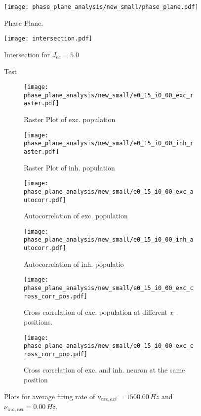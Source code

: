 \documentclass[a4paper,12pt]{article}
\begin{document}
    \begin{figure}
    \centering
        \texttt{[image: phase\_plane\_analysis/new\_small/phase\_plane.pdf]}
        \caption{Phase Plane.}
    \end{figure}
    
    \begin{figure}
    \centering
        \texttt{[image: intersection.pdf]}
        \caption{Intersection for $J_{ee} = 5.0$}
    \end{figure}
    \clearpage
    \begin{landscape}
    \begin{figure}
        \caption{Test}
    \end{figure}
    \end{landscape}
    \clearpage
\begin{figure}
    \begin{subfigure}[b]{0.49\textwidth}
        \texttt{[image: phase\_plane\_analysis/new\_small/e0\_15\_i0\_00\_exc\_raster.pdf]}
        \caption{Raster Plot of exc. population}
    \end{subfigure}
    \begin{subfigure}[b]{0.49\textwidth}
        \texttt{[image: phase\_plane\_analysis/new\_small/e0\_15\_i0\_00\_inh\_raster.pdf]}
        \caption{Raster Plot of inh. population}
    \end{subfigure}
    \begin{subfigure}[b]{0.49\textwidth}
        \texttt{[image: phase\_plane\_analysis/new\_small/e0\_15\_i0\_00\_exc\_autocorr.pdf]}
        \caption{Autocorrelation of exc. population}
    \end{subfigure}
    \begin{subfigure}[b]{0.49\textwidth}
        \texttt{[image: phase\_plane\_analysis/new\_small/e0\_15\_i0\_00\_inh\_autocorr.pdf]}
        \caption{Autocorrelation of inh. populatio}
    \end{subfigure}
    \begin{subfigure}[b]{0.49\textwidth}
        \texttt{[image: phase\_plane\_analysis/new\_small/e0\_15\_i0\_00\_exc\_cross\_corr\_pos.pdf]}
        \caption{Cross correlation of exc. population at different $x$-positions.}
    \end{subfigure}
    \begin{subfigure}[b]{0.49\textwidth}
        \texttt{[image: phase\_plane\_analysis/new\_small/e0\_15\_i0\_00\_exc\_cross\_corr\_pop.pdf]}
        \caption{Cross correlation of exc. and inh. neuron at the same position}
    \end{subfigure}
    \caption{Plots for average firing rate of 
                $\nu_{exc,ext} = 1500.00 \,\si{Hz}$ and $\nu_{inh,ext} = 0.00 \,\si{Hz}$.
                }
\end{figure}
    
\end{document}
